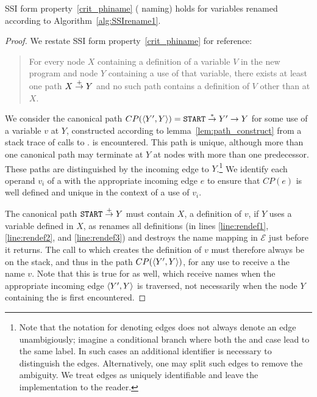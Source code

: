 \begin{lemma}\label{lem:renamephi}
SSI form property~\ref{crit_phiname} (\phifunction{} naming) holds
for variables renamed according to Algorithm~\ref{alg:SSIrename1}.
\end{lemma}
\begin{proof}
We restate SSI form property~\ref{crit_phiname} for reference:
\begin{quote}
For every node $X$ containing a definition of a variable $V$ in
the new program and node $Y$ containing a use of that variable, there
exists at least one path $X \stackrel{+}{\rightarrow} Y$ and no such path contains a
definition of $V$ other than at $X$.
\end{quote}
We consider the canonical path 
$CP(\left\langle Y',Y \right\rangle)=\texttt{START}\stackrel{*}{\rightarrow} Y' \rightarrow Y$
for some use of a variable $v$ at $Y$, constructed according to
lemma~\ref{lem:path_construct} 
from a stack trace of calls to .
is encountered.  This path is unique, although more than one canonical
path may terminate at $Y$ at nodes with more than one predecessor.
These paths are distinguished by the incoming edge to
$Y$.\footnote{Note that the notation  for denoting edges
does not always denote an edge unambigiously; imagine a conditional
branch where both the  and  case lead to the
same label.  In such cases an additional identifier is necessary to
distinguish the edges.  Alternatively, one may split such edges to
remove the ambiguity.  We treat edges as uniquely identifiable and
leave the implementation to the reader.}  We identify each operand
$v_i$ of a \phifunction{} with the appropriate incoming edge $e$ to
ensure that $CP(e)$ is well defined and unique in the context of a
use of $v_i$.

The canonical path $\texttt{START}\stackrel{+}{\rightarrow} Y$ must contain $X$, a definition of
$v$, if $Y$ uses a variable defined in $X$, as  renames
all definitions (in lines \ref{line:rendef1}, \ref{line:rendef2}, and
\ref{line:rendef3}) and destroys the name mapping in $\mathcal{E}$
just before it returns.  The call to  which creates the
definition of $v$ must therefore always be on the stack, and thus in
the path $CP(\left\langle Y',Y \right\rangle)$, for any use to receive a the name $v$.
Note that this is
true for  as well, which receive names when the
appropriate incoming edge $\left\langle Y',Y \right\rangle$ is traversed, not necessarily
when the node $Y$ containing the \phifunction{} is first encountered.


\end{proof}
